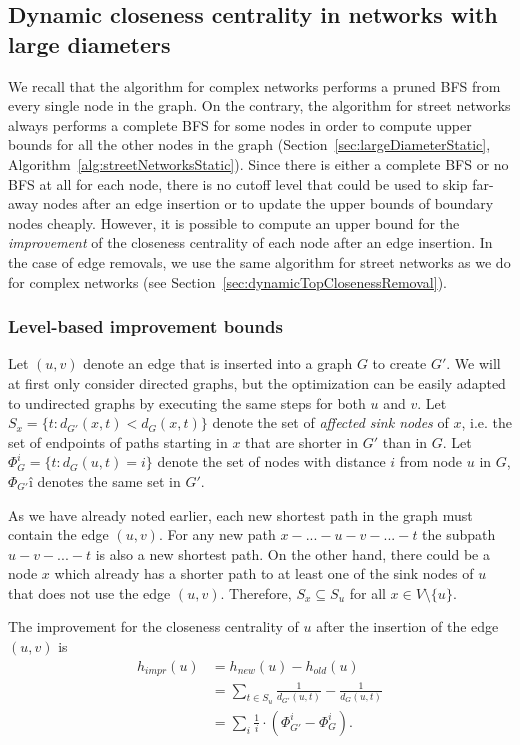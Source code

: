 \subsection{Dynamic closeness centrality in networks with large diameters}
We recall that the algorithm for complex networks performs a pruned BFS from every single node in the graph. On the contrary, the algorithm for street networks always performs a complete BFS for some nodes in order to compute upper bounds for all the other nodes in the graph (Section~\ref{sec:largeDiameterStatic}, Algorithm~\ref{alg:streetNetworksStatic}). Since there is either a complete BFS or no BFS at all for each node, there is no cutoff level that could be used to skip far-away nodes after an edge insertion or to update the upper bounds of boundary nodes cheaply. However, it is possible to compute an upper bound for the \emph{improvement} of the closeness centrality of each node after an edge insertion. In the case of edge removals, we use the same algorithm for street networks as we do for complex networks (see Section~\ref{sec:dynamicTopClosenessRemoval}).


\subsubsection{Level-based improvement bounds}
\label{sec:levelBasedImprovementBounds}
Let $(u, v)$ denote an edge that is inserted into a graph $G$ to create $G'$. We will at first only consider directed graphs, but the optimization can be easily adapted to undirected graphs by executing the same steps for both $u$ and $v$.  Let $S_{x} = \{t : d_{G'}(x, t) < d_G(x, t)\}$ denote the set of \emph{affected sink nodes} of $x$, i.e. the set of endpoints of paths starting in $x$ that are shorter in $G'$ than in $G$. Let $\Phi_{G}^i = \{t : d_G(u, t) = i\}$ denote the set of nodes with distance $i$ from node $u$ in $G$, $\Phi_{G'}î$ denotes the same set in $G'$.

As we have already noted earlier, each new shortest path in the graph must contain the edge $(u, v)$. For any new path $x - ... - u - v - ... - t$ the subpath $u - v - ... - t$ is also a new shortest path. On the other hand, there could be a node $x$ which already has a shorter path to at least one of the sink nodes of $u$ that does not use the edge $(u, v)$. Therefore, $S_x \subseteq S_u$ for all $x \in V \setminus \{u\}$.

\begin{definition}
The improvement for the closeness centrality of $u$ after the insertion of the edge $(u, v)$ is 
\begin{align}
	h_{impr}(u) &= h_{new}(u) - h_{old}(u) \nonumber \\
	            &= \sum_{t \in S_u}{\frac{1}{d_{G'}(u, t)} - \frac{1}{d_G(u, t)}} \nonumber \\
	            &= \sum_{i}{\frac{1}{i} \cdot \left(\Phi_{G'}^i - \Phi_G^i\right)} \label{eq:levelImprovementBound}.
\end{align}
\end{definition}

